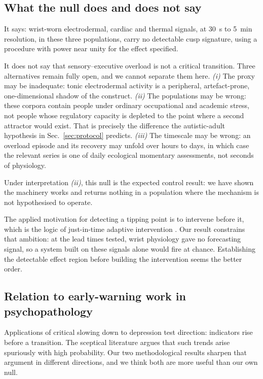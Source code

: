 \documentclass[conference]{IEEEtran}
\begin{document}
\subsection{What the null does and does not say}
It says: wrist-worn electrodermal, cardiac and thermal signals, at
\SI{30}{\second} to \SI{5}{\minute} resolution, in these three populations,
carry no detectable cusp signature, using a procedure with power near unity for
the effect specified.

It does not say that sensory--executive overload is not a critical transition.
Three alternatives remain fully open, and we cannot separate them here.
\emph{(i)} The proxy may be inadequate: tonic electrodermal activity is a
peripheral, artefact-prone, one-dimensional shadow of the construct.
\emph{(ii)} The populations may be wrong: these corpora contain people under
ordinary occupational and academic stress, not people whose regulatory capacity
is depleted to the point where a second attractor would exist. That is
precisely the difference the autistic-adult hypothesis in
Sec.~\ref{sec:protocol} predicts. \emph{(iii)} The timescale may be wrong: an
overload episode and its recovery may unfold over hours to days, in which case
the relevant series is one of daily ecological momentary assessments, not
seconds of physiology.

Under interpretation \emph{(ii)}, this null is the expected control result: we
have shown the machinery works and returns nothing in a population where the
mechanism is not hypothesised to operate.

The applied motivation for detecting a tipping point is to intervene before it,
which is the logic of just-in-time adaptive intervention
\cite{nahumshani2018}. Our result constrains that ambition: at the lead times
tested, wrist physiology gave no forecasting signal, so a system built on these
signals alone would fire at chance. Establishing the detectable effect region
before building the intervention seems the better order.

\subsection{Relation to early-warning work in psychopathology}
Applications of critical slowing down to depression
\cite{leemput2014,wichers2020,smit2025} test direction: indicators rise before a
transition. The sceptical literature \cite{ditlevsen2010,boettiger2012} argues
that such trends arise spuriously with high probability. Our two methodological
results sharpen that argument in different directions, and we think both are
more useful than our own null.
\end{document}
